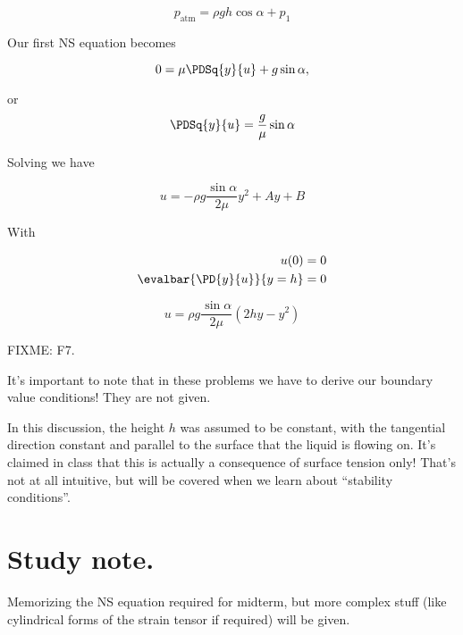 \begin{equation}\label{eqn:continuumL12:430}
p_{\text{atm}} = \rho g h \cos\alpha + p_1
\end{equation}

Our first NS equation becomes

\begin{equation}\label{eqn:continuumL12:450}
0 = \mu \PDSq{y}{u} + g \sin\alpha,
\end{equation}

or
\begin{equation}\label{eqn:continuumL12:470}
\PDSq{y}{u} = \frac{g}{\mu} \sin\alpha
\end{equation}

Solving we have

\begin{equation}\label{eqn:continuumL12:490}
u = - \rho g \frac{\sin\alpha}{2 \mu} y^2 + A y + B
\end{equation}

With

\begin{align}\label{eqn:continuumL12:510}
u(0) &= 0 \\
\evalbar{\PD{y}{u}}{y = h} &= 0
\end{align}

\begin{equation}\label{eqn:classicalMechanicsPs2:530}
u = \rho g \frac{\sin\alpha}{2 \mu} \left( 2 h y - y^2 \right) 
\end{equation}

FIXME: F7.

It's important to note that in these problems we have to derive our boundary value conditions!  They are not given.

In this discussion, the height $h$ was assumed to be constant, with the tangential direction constant and parallel to the surface that the liquid is flowing on.  It's claimed in class that this is actually a consequence of surface tension only!  That's not at all intuitive, but will be covered when we learn about ``stability conditions''.

\section{Study note.}

Memorizing the NS equation required for midterm, but more complex stuff (like cylindrical forms of the strain tensor if required) will be given.


\EndNoBibArticle
